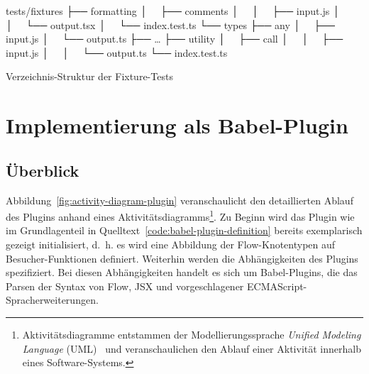 \bigskip
\begin{listing}[htbp]
  \begin{textcode}
  tests/fixtures
  ├── formatting
  │   ├── comments
  │   │   ├── input.js
  │   │   └── output.tsx
  │   └── index.test.ts
  └── types
      ├── any
      │   ├── input.js
      │   └── output.ts
      ├── …
      ├── utility
      │   ├── call
      │   │   ├── input.js
      │   │   └── output.ts
      └── index.test.ts
  \end{textcode}
  \caption{Verzeichnis-Struktur der Fixture-Tests}
  \captionsetup{justification=raggedright,singlelinecheck=false}
  \label{CODE:FIXTURE_TESTS}
\end{listing}

\section{Implementierung als Babel-Plugin}
\subsection{Überblick}

Abbildung~\ref{fig:activity-diagram-plugin} veranschaulicht den detaillierten Ablauf des Plugins anhand eines Aktivitätsdiagramms\footnote{Aktivitätsdiagramme entstammen der Modellierungssprache \textit{Unified Modeling Language} (UML)~\autocite{OMG:UML} und veranschaulichen den Ablauf einer Aktivität innerhalb eines Software-Systems.}. Zu Beginn wird das Plugin wie im Grundlagenteil in Quelltext~\ref{code:babel-plugin-definition} bereits exemplarisch gezeigt initialisiert, d.~h. es wird eine Abbildung der Flow-Knotentypen auf Besucher-Funktionen definiert. Weiterhin werden die Abhängigkeiten des Plugins spezifiziert. Bei diesen Abhängigkeiten handelt es sich um Babel-Plugins, die das Parsen der Syntax von Flow, JSX und vorgeschlagener ECMAScript-Spracherweiterungen.


